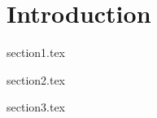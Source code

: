 \documentclass[class=custom,crop=false]{standalone}
\begin{document}
\chapter{Introduction}

{section1.tex}

{section2.tex}

{section3.tex}
\end{document}
